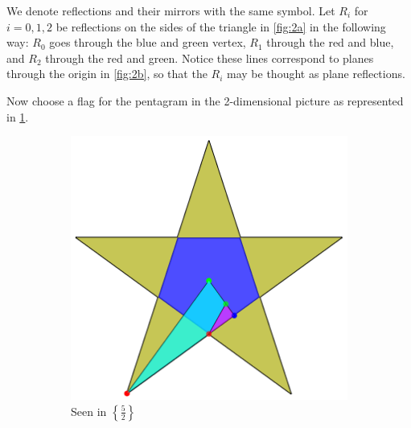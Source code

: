 \documentclass{article}
\theoremstyle{definition}
\begin{document}
	We denote reflections and their mirrors with the same symbol. Let $R_i$ for $i=0,1,2$ be reflections on the sides of the triangle in \cref{fig:2a} in the following way: $R_0$ goes through the blue and green vertex, $R_1$ through the red and blue, and $R_2$ through the red and green. Notice these lines correspond to planes through the origin in \cref{fig:2b}, so that the $R_i$ may be thought as plane reflections.
	
	Now choose a flag for the pentagram in the 2-dimensional picture as represented in \cref{fig:3a}.
	
	\begin{figure}[H]
		\begin{center}
			\begin{subfigure}{0.4\linewidth}
				\centering
				\includegraphics[width=\linewidth]{fig3a}
				\caption{Seen in $\left\{\frac{5}{2}\right\}$}\label{fig:3a}
			\end{subfigure}
			\begin{subfigure}{0.4\linewidth}
				\centering

\end{subfigure}
\end{center}
\end{figure}
\end{document}
